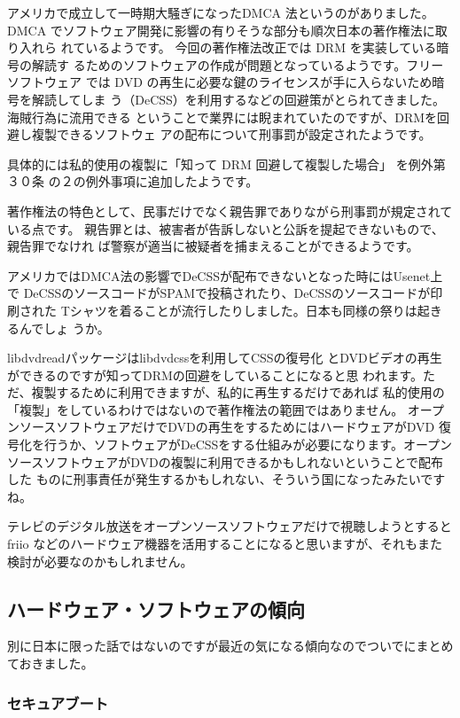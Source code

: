 \documentclass[mingoth,a4paper]{jsarticle}
\begin{document}
アメリカで成立して一時期大騒ぎになったDMCA 法というのがありました。 DMCA
でソフトウェア開発に影響の有りそうな部分も順次日本の著作権法に取り入れら
れているようです。 今回の著作権法改正では DRM を実装している暗号の解読す
るためのソフトウェアの作成が問題となっているようです。フリーソフトウェア
では DVD の再生に必要な鍵のライセンスが手に入らないため暗号を解読してしま
う（DeCSS）を利用するなどの回避策がとられてきました。海賊行為に流用できる
ということで業界には睨まれていたのですが、DRMを回避し複製できるソフトウェ
アの配布について刑事罰が設定されたようです。

具体的には私的使用の複製に「知って DRM 回避して複製した場合」 を例外第３０条
の２の例外事項に追加したようです。

著作権法の特色として、民事だけでなく親告罪でありながら刑事罰が規定されている点です。
親告罪とは、被害者が告訴しないと公訴を提起できないもので、親告罪でなけれ
ば警察が適当に被疑者を捕まえることができるようです。

アメリカではDMCA法の影響でDeCSSが配布できないとなった時にはUsenet上で
DeCSSのソースコードがSPAMで投稿されたり、DeCSSのソースコードが印刷された
Tシャツを着ることが流行したりしました。日本も同様の祭りは起きるんでしょ
うか。

libdvdreadパッケージは\cite{libdvdread-css}libdvdcssを利用してCSSの復号化
とDVDビデオの再生ができるのですが知ってDRMの回避をしていることになると思
われます。ただ、複製するために利用できますが、私的に再生するだけであれば
私的使用の「複製」をしているわけではないので著作権法の範囲ではありません。
オープンソースソフトウェアだけでDVDの再生をするためにはハードウェアがDVD
復号化を行うか、ソフトウェアがDeCSSをする仕組みが必要になります。オープン
ソースソフトウェアがDVDの複製に利用できるかもしれないということで配布した
ものに刑事責任が発生するかもしれない、そういう国になったみたいですね。

テレビのデジタル放送をオープンソースソフトウェアだけで視聴しようとすると
friio などのハードウェア機器を活用することになると思いますが、それもまた
検討が必要なのかもしれません。

\subsection{ハードウェア・ソフトウェアの傾向}

別に日本に限った話ではないのですが最近の気になる傾向なのでついでにまとめ
ておきました。

\subsubsection{セキュアブート}
\end{document}
